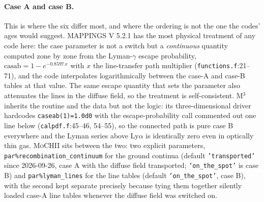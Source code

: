 \documentclass[english,a4paper]{my_memo}
\newcommand{\code}[1]{\texttt{#1}}
\newcommand{\MoCHII}{\textsc{MoCHII}}
\newcommand{\Mthree}{M$^3$}
\newcommand{\Mappings}{MAPPINGS V 5.2.1}
\begin{document}
\paragraph{Case A and case B.}  This is where the six differ most, and where
the ordering is not the one the codes' ages would suggest.  \Mappings{} has
the most physical treatment of any code here: the case parameter is not a
switch but a \emph{continuous} quantity computed zone by zone from the
Lyman-$\gamma$ escape probability,
$\mathrm{casab} = 1 - e^{-0.8597\,x}$ with $x$ the line-transfer path
multiplier (\code{functions.f}:21--71), and the code interpolates
logarithmically between the case-A and case-B tables at that value.  The same
escape quantity that sets the parameter also attenuates the lines in the
diffuse field, so the treatment is self-consistent.  \Mthree{} inherits the
routine and the data but not the logic: its three-dimensional driver
hardcodes \code{caseab(1)=1.0d0} with the escape-probability call commented
out one line below (\code{calpdf.f}:45--46, 54--55), so the connected path is
pure case B everywhere and the Lyman series above Ly$\alpha$ is identically
zero even in optically thin gas.  \MoCHII{} sits between the two: two
explicit parameters, \code{par\%recombination\_continuum} for the ground
continua (default \code{'transported'} since 2026-09-26, case A with the
diffuse field transported; \code{'on\_the\_spot'} is case B) and
\code{par\%lyman\_lines} for the line tables (default \code{'on\_the\_spot'},
case B), with the second kept separate precisely because tying them together
silently loaded case-A line tables whenever the diffuse field was switched on.
\end{document}
